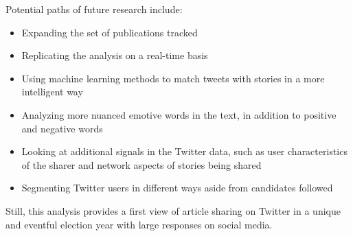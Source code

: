 \documentclass[letterpaper]{article}
\begin{document}
Potential paths of future research include:
\begin{itemize}
\item Expanding the set of publications tracked  
\item Replicating the analysis on a real-time basis
\item Using machine learning methods to match tweets with stories in a more intelligent way
\item Analyzing more nuanced emotive words in the text, in addition to positive and negative words
\item Looking at additional signals in the Twitter data, such as user characteristics of the sharer and network aspects of stories being shared
\item Segmenting Twitter users in different ways aside from candidates followed
 \end{itemize}

Still, this analysis provides a first view of article sharing on Twitter in a unique and eventful election year with large responses on social media.
\end{document}
